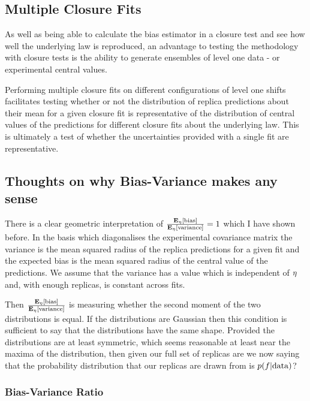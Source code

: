 \subsection{Multiple Closure Fits}

As well as being able to calculate the bias estimator in a closure test and see
how well the underlying law is reproduced, an advantage to testing the
methodology with closure tests is the ability to generate ensembles of level one
data - or experimental central values.

Performing multiple closure fits on
different configurations of level one shifts facilitates testing whether or not
the distribution of replica predictions about their mean for a given closure fit
is representative of the distribution of central values of the
predictions for different closure fits about the underlying law. This is ultimately
a test of whether the uncertainties provided with a single fit are
representative.

\subsection{Thoughts on why Bias-Variance makes any sense}

There is a clear geometric interpretation of $\frac{\mathbf{E}_{\eta}\left[ {\rm bias} \right]}{\mathbf{E}_{\eta}\left[ {\rm variance} \right]} = 1$
which I have shown before. In the basis which diagonalises the experimental
covariance matrix the variance is the mean squared radius of the replica predictions for a
given fit and the expected bias is the mean squared radius of the central value
of the predictions. We assume that the variance has a value which is
independent of $\eta$ and, with enough replicas, is constant across fits.

Then $\frac{\mathbf{E}_{\eta}\left[ {\rm bias} \right]}{\mathbf{E}_{\eta}\left[ {\rm variance} \right]}$ is measuring whether the second
moment of the two distributions is equal. If the distributions are Gaussian
then this condition is sufficient to say that the distributions have the same shape.
Provided the distributions are at least symmetric, which seems reasonable at least
near the maxima of the distribution, then given our full set of replicas are
we now saying that the probability distribution that our replicas are drawn from
is $p(f| {\rm data})$?

\subsubsection{Bias-Variance Ratio}

